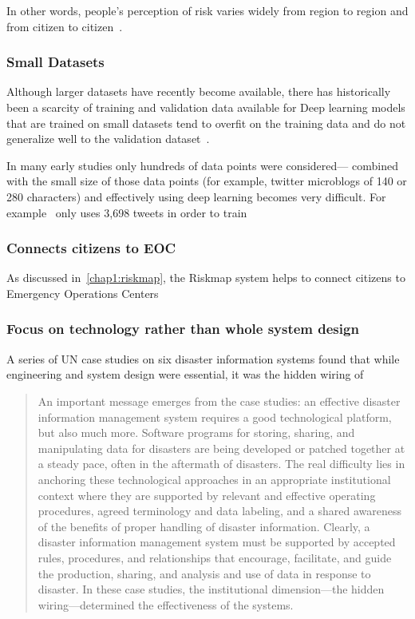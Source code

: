 In other words, people's perception of risk varies widely from region to region
and from citizen to citizen~\cite{quarantelliUrbanVulnerabilityDisasters2003}.

\subsubsection{Small Datasets}
Although larger datasets have recently become available, there has
historically been a scarcity of training and validation data available for
Deep learning models that are trained on small datasets tend to overfit on the
training data and do not generalize well to the validation
dataset~\cite{perezEffectivenessDataAugmentation2017}.

In many early studies only hundreds of data points were considered--- combined
with the small size of those data points (for example, twitter microblogs of
140 or 280 characters) and effectively using deep learning becomes very
difficult.
For example~\cite{nagyCrowdSentimentDetection2012} only uses 3,698 tweets in
order to train 

\subsubsection{Connects citizens to EOC}
As discussed in~\ref{chap1:riskmap}, the Riskmap system helps to connect
citizens to Emergency Operations Centers

\subsubsection{Focus on technology rather than whole system design}
A series of UN case studies on six disaster information systems found that while
engineering and system design were essential, it was the hidden wiring of 
\begin{quote}
An important message emerges from the case studies: an effective disaster
information management system requires a good technological platform,
but also much more. Software programs for storing, sharing, and manipulating
data for disasters are being developed or patched together at a steady pace,
often in the aftermath of disasters. The real difficulty lies in anchoring
these technological approaches in an appropriate institutional context where
they are supported by relevant and effective operating procedures, agreed
terminology and data labeling, and a shared awareness of the benefits of proper
handling of disaster information. Clearly, a disaster information management
system must be supported by accepted rules, procedures, and relationships
that encourage, facilitate, and guide the production, sharing, and analysis and
use of data in response to disaster. In these case studies, the institutional
dimension---the hidden wiring---determined the effectiveness of the
systems.~\cite{aminDataNaturalDisasters2008}
\end{quote}

